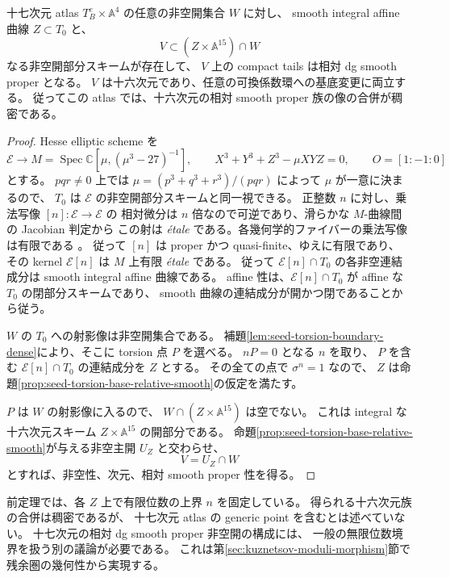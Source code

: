 \begin{theorem}
\label{thm:seed-sixteen-dimensional-dense-families}
十七次元 atlas $T_B^e\times\mathbb A^4$ の任意の非空開集合 $W$ に対し、
smooth integral affine 曲線 $Z\subset T_0$ と、
\[
 V\subset (Z\times\mathbb A^{15})\cap W
\]
なる非空開部分スキームが存在して、
$V$ 上の compact tails は相対 dg smooth proper となる。
$V$ は十六次元であり、任意の可換係数環への基底変更に両立する。
従ってこの atlas では、十六次元の相対 smooth proper 族の像の合併が稠密である。
\end{theorem}

\begin{proof}
Hesse elliptic scheme を
\[
 \mathcal E\longrightarrow M
   =\operatorname{Spec}\mathbb C[\mu,(\mu^3-27)^{-1}],
 \qquad X^3+Y^3+Z^3-\mu XYZ=0,
 \qquad O=[1:-1:0]
\]
とする。
$pqr\ne0$ 上では $\mu=(p^3+q^3+r^3)/(pqr)$ によって
$\mu$ が一意に決まるので、
$T_0$ は $\mathcal E$ の非空開部分スキームと同一視できる。
正整数 $n$ に対し、乗法写像 $[n]:\mathcal E\to\mathcal E$ の
相対微分は $n$ 倍なので可逆であり、滑らかな $M$-曲線間の Jacobian 判定から
この射は \emph{\'etale} である。各幾何学的ファイバーの乗法写像は有限である
\cite[Lemmas~39.9.8,39.9.9]{StacksEllipticTorsion}。
従って $[n]$ は proper かつ quasi-finite、ゆえに有限であり、
その kernel $\mathcal E[n]$ は $M$ 上有限 \emph{\'etale} である。
従って $\mathcal E[n]\cap T_0$ の各非空連結成分は
smooth integral affine 曲線である。
affine 性は、$\mathcal E[n]\cap T_0$ が affine な $T_0$ の閉部分スキームであり、
smooth 曲線の連結成分が開かつ閉であることから従う。

$W$ の $T_0$ への射影像は非空開集合である。
補題\ref{lem:seed-torsion-boundary-dense}により、そこに torsion 点 $P$ を選べる。
$nP=0$ となる $n$ を取り、
$P$ を含む $\mathcal E[n]\cap T_0$ の連結成分を $Z$ とする。
その全ての点で $\sigma^n=1$ なので、
$Z$ は命題\ref{prop:seed-torsion-base-relative-smooth}の仮定を満たす。

$P$ は $W$ の射影像に入るので、
$W\cap(Z\times\mathbb A^{15})$ は空でない。
これは integral な十六次元スキーム $Z\times\mathbb A^{15}$ の開部分である。
命題\ref{prop:seed-torsion-base-relative-smooth}が与える非空主開 $U_Z$ と交わらせ、
\[
 V=U_Z\cap W
\]
とすれば、非空性、次元、相対 smooth proper 性を得る。
\end{proof}

\begin{remark}[十七次元の開性との区別]
前定理では、各 $Z$ 上で有限位数の上界 $n$ を固定している。
得られる十六次元族の合併は稠密であるが、
十七次元 atlas の generic point を含むとは述べていない。
十七次元の相対 dg smooth proper 非空開の構成には、
一般の無限位数境界を扱う別の議論が必要である。
これは第\ref{sec:kuznetsov-moduli-morphism}節で残余圏の幾何性から実現する。
\end{remark}


